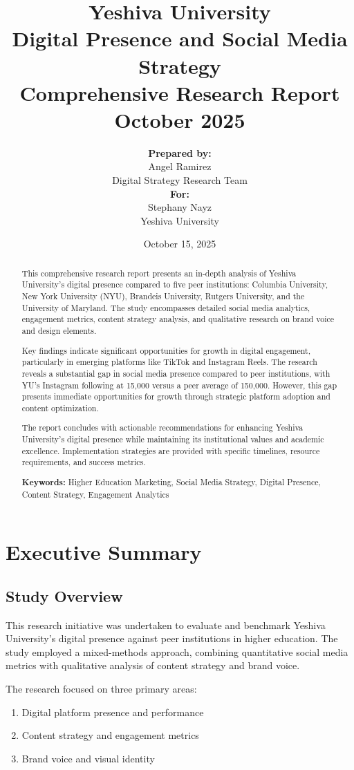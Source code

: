 \documentclass[12pt]{report}
\title{
    \Huge\textbf{Yeshiva University}\\[1cm]
    \huge\textbf{Digital Presence and Social Media Strategy}\\[0.5cm]
    \Large\textbf{Comprehensive Research Report}\\[1cm]
    \large October 2025
}
\author{
    \textbf{Prepared by:}\\
    Angel Ramirez\\
    Digital Strategy Research Team\\[1cm]
    \textbf{For:}\\
    Stephany Nayz\\
    Yeshiva University
}
\date{October 15, 2025}
\begin{document}
\maketitle

\begin{abstract}
This comprehensive research report presents an in-depth analysis of Yeshiva University's digital presence compared to five peer institutions: Columbia University, New York University (NYU), Brandeis University, Rutgers University, and the University of Maryland. The study encompasses detailed social media analytics, engagement metrics, content strategy analysis, and qualitative research on brand voice and design elements.

Key findings indicate significant opportunities for growth in digital engagement, particularly in emerging platforms like TikTok and Instagram Reels. The research reveals a substantial gap in social media presence compared to peer institutions, with YU's Instagram following at 15,000 versus a peer average of 150,000. However, this gap presents immediate opportunities for growth through strategic platform adoption and content optimization.

The report concludes with actionable recommendations for enhancing Yeshiva University's digital presence while maintaining its institutional values and academic excellence. Implementation strategies are provided with specific timelines, resource requirements, and success metrics.

\textbf{Keywords:} Higher Education Marketing, Social Media Strategy, Digital Presence, Content Strategy, Engagement Analytics
\end{abstract}

\tableofcontents

\chapter{Executive Summary}

\section{Study Overview}
This research initiative was undertaken to evaluate and benchmark Yeshiva University's digital presence against peer institutions in higher education. The study employed a mixed-methods approach, combining quantitative social media metrics with qualitative analysis of content strategy and brand voice.

The research focused on three primary areas:
\begin{enumerate}
    \item Digital platform presence and performance
    \item Content strategy and engagement metrics
    \item Brand voice and visual identity
\end{enumerate}
\end{document}
